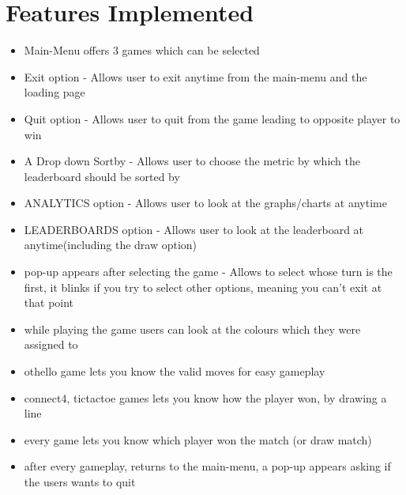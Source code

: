 \documentclass[12pt]{article}
\begin{document}
\section{Features Implemented}
\begin{itemize}
    \item Main-Menu offers 3 games which can be selected
    \item Exit option - Allows user to exit anytime from the main-menu and the loading page
    \item Quit option - Allows user to quit from the game leading to opposite player to win
    \item A Drop down Sortby - Allows user to choose the metric by which the leaderboard should be sorted by
    \item ANALYTICS option - Allows user to look at the graphs/charts at anytime
    \item LEADERBOARDS option - Allows user to look at the leaderboard at anytime(including the draw option)
    \item pop-up appears after selecting the game - Allows to select whose turn is the first, it blinks if you try to select other options, meaning you can't exit at that point
    \item while playing the game users can look at the colours which they were assigned to
    \item othello game lets you know the valid moves for easy gameplay
    \item connect4, tictactoe games lets you know how the player won, by drawing a line
    \item every game lets you know which player won the match (or draw match)
    \item after every gameplay, returns to the main-menu, a pop-up appears asking if the users wants to quit
\end{itemize}
\clearpage
\end{document}
